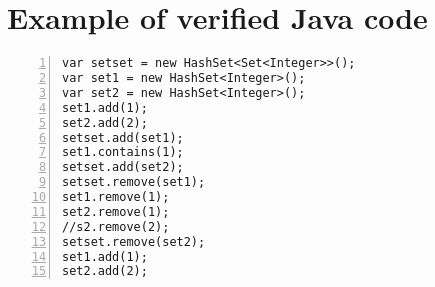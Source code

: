 \appendix
\label{appendix}
\section{Example of verified Java code}
\begin{lstlisting}[numbers=left]
var setset = new HashSet<Set<Integer>>();
var set1 = new HashSet<Integer>();
var set2 = new HashSet<Integer>();
set1.add(1);
set2.add(2);
setset.add(set1);
set1.contains(1);
setset.add(set2);
setset.remove(set1);
set1.remove(1);
set2.remove(1);
//s2.remove(2);
setset.remove(set2);
set1.add(1);
set2.add(2);
\end{lstlisting}
